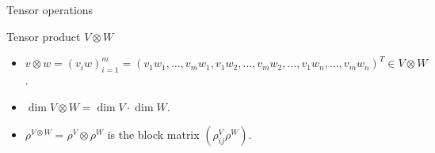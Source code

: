 \documentclass[handout, 10pt]{beamer}
\newcommand{\GL}{\text{GL}}
\newcommand{\RR}{\mathbb{R}}
\begin{document}
\begin{frame}[allowframebreaks]{Tensor operations}
		
%				
		
		\framebreak
		
		\begin{block}{Tensor product $V \otimes W$}
			\begin{itemize}
				\item $v \otimes w = (v_iw)_{i=1}^{m} = (v_1 w_1, \dots, v_m w_1, v_1 w_2, \dots, v_m w_2, \dots, v_1 w_n, \dots, v_m w_n)^T \in V \otimes W$.
				
				\item $\dim V \otimes W = \dim V \cdot \dim W$.
				
				\item $\rho^{V \otimes W} = \rho^V \otimes \rho^W$ is the block matrix $(\rho^V_{ij} \rho^W)$.
				

\end{itemize}
\end{block}
\end{frame}
\end{document}
